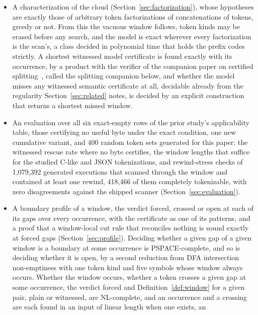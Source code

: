 \documentclass[11pt,a4paper]{article}
\theoremstyle{definition}
\theoremstyle{plain}
\begin{document}
\begin{itemize}
shortest windows of length $2^{\Omega(\sqrt n)}$, with exact minima 4, 6, 11, 18, 67, 68, 429, 850 and 2{,}531 for its
first nine members, searched by a figure program, and sources that share one transition table give shortest windows of
$2^{\Omega(n)}$ bytes, the largest order possible.
\item A characterization of the cloud (Section~\ref{sec:factorization}), whose hypotheses are exactly those of arbitrary
token factorizations of concatenations of tokens, greedy or not. From this the vacuous window follows, token kinds may
be erased before any search, and the model is exact wherever every factorization is the scan's, a class decided in
polynomial time that holds the prefix codes strictly. A shortest witnessed model certificate is found exactly with its
occurrence, by a product with the verifier of the companion paper on certified splitting~\cite{nidhogg2026splitting},
called the splitting companion below, and whether the model misses any witnessed semantic certificate at all, decidable
already from the regularity Section~\ref{sec:related} notes, is decided by an explicit construction that returns a
shortest missed window.
\item An evaluation over all six exact-empty rows of the prior study's applicability table, those certifying no useful
byte under the exact condition, one new cumulative variant, and 400 random token sets generated for this paper: the
witnessed rescue rate where no byte certifies, the window lengths that suffice for the studied C-like and JSON
tokenizations, and rewind-stress checks of 1{,}079{,}392 generated executions that scanned through the window and
contained at least one rewind, 418{,}466 of them completely tokenizable, with zero disagreements against the shipped
scanner (Section~\ref{sec:evaluation}).
\item
A boundary profile of a window, the verdict forced, crossed or open at each of its gaps over every occurrence, with the
certificate as one of its patterns, and a proof that a window-local cut rule that reconciles nothing is sound exactly at
forced gaps (Section~\ref{sec:profile}). Deciding whether a given gap of a given window is a boundary at some occurrence
is PSPACE-complete, and so is deciding whether it is open, by a second reduction from DFA intersection non-emptiness
with one token kind and five symbols whose window always occurs. Whether the window occurs, whether a token crosses a
given gap at some occurrence, the verdict forced and Definition~\ref{def:window} for a given pair, plain or witnessed,
are NL-complete, and an occurrence and a crossing are each found in an input of linear length when one exists, an

\end{itemize}
\end{document}
